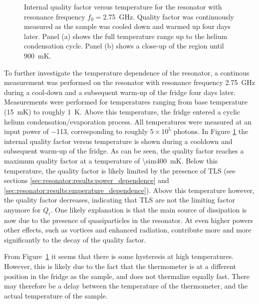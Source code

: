 \begin{figure}[h]
\begin{subfigure}[b]{.49\textwidth}
    \end{subfigure}
    \caption{Internal quality factor versus temperature for the resonator with resonance frequency $f_0= $\SI{2.75}{\giga \hertz}. Quality factor was continuously measured as the sample was cooled down and warmed up four days later. Panel (a) shows the full temperature range up to the helium condensation cycle. Panel (b) shows a close-up of the region until \SI{900}{\milli \kelvin}.}
    \label{fig:temperature_tracking_Qi}
\end{figure}

To further investigate the temperature dependence of the resonator, a continous measurement was performed on the resonator with resonance frequency \SI{2.75}{\giga \hertz} during a cool-down and a subsequent warm-up of the fridge four days later. Measurements were performed for temperatures ranging from base temperature (\SI{15}{\milli \kelvin}) to roughly \SI{1}{\kelvin}. Above this temperature, the fridge entered a cyclic helium condensation/evaporation process. All temperatures were measured at an input power of \SI{-113}{\dBm}, corresponding to roughly $5 \times 10^5$ photons. In Figure \ref{fig:temperature_tracking_Qi} the internal quality factor versus temperature is shown during a cooldown and subsequent warm-up of the fridge. As can be seen, the quality factor reaches a maximum quality factor at a temperature of \SI{\sim400}{\milli \kelvin}. Below this temperature, the quality factor is likely limited by the presence of TLS (see sections \ref{sec:resonator:results:power_dependence} and \ref{sec:resonator:results:emperature_dependence}). Above this temperature however, the quality factor decreases, indicating that TLS are not the limiting factor anymore for $Q_i$. One likely explanation is that the main source of dissipation is now due to the presence of quasiparticles in the resonator. At even higher powers other effects, such as vortices and enhanced radiation, contribute more and more significantly to the decay of the quality factor.

From Figure~\ref{fig:temperature_tracking_Qi} it seems that there is some hysteresis at high temperatures. However, this is likely due to the fact that the thermometer is at a different position in the fridge as the sample, and does not thermalize equally fast. There may therefore be a delay between the temperature of the thermometer, and the actual temperature of the sample.

